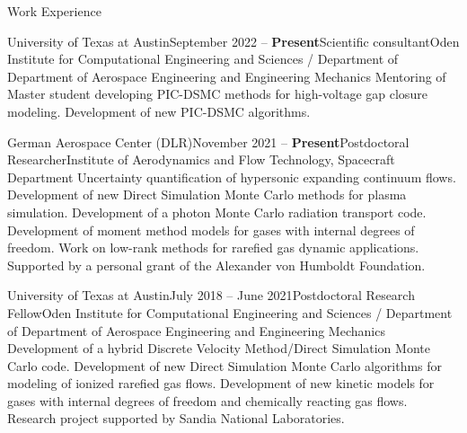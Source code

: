 \documentclass{resume} %
\begin{document}

\begin{rSection}{Work Experience}


\begin{rSubsection}{University of Texas at Austin}{September 2022 -- \textbf{Present}}{Scientific consultant}{Oden Institute for Computational Engineering and Sciences / Department of Department of Aerospace Engineering and Engineering Mechanics}
Mentoring of Master student developing PIC-DSMC methods for high-voltage gap closure modeling. Development of new PIC-DSMC algorithms.
\end{rSubsection}

\begin{rSubsection}{German Aerospace Center (DLR)}{November 2021 -- \textbf{Present}}{Postdoctoral Researcher}{Institute of Aerodynamics and Flow Technology, Spacecraft Department}
Uncertainty quantification of hypersonic expanding continuum flows. Development of new Direct Simulation Monte Carlo methods for plasma simulation. Development of a photon Monte Carlo radiation transport code. Development of moment method models for gases with internal degrees of freedom. Work on low-rank methods for rarefied gas dynamic applications. Supported by a personal grant of the Alexander von Humboldt Foundation.
\end{rSubsection}

\begin{rSubsection}{University of Texas at Austin}{July 2018 -- June 2021}{Postdoctoral Research Fellow}{Oden Institute for Computational Engineering and Sciences / Department of Department of Aerospace Engineering and Engineering Mechanics}
Development of a hybrid Discrete Velocity Method/Direct Simulation Monte Carlo code. Development of new Direct Simulation Monte Carlo algorithms for modeling of ionized rarefied gas flows. Development of new kinetic models for gases with internal degrees of freedom and chemically reacting gas flows.
Research project supported by Sandia National Laboratories.
\end{rSubsection}



\end{rSection}
\end{document}
